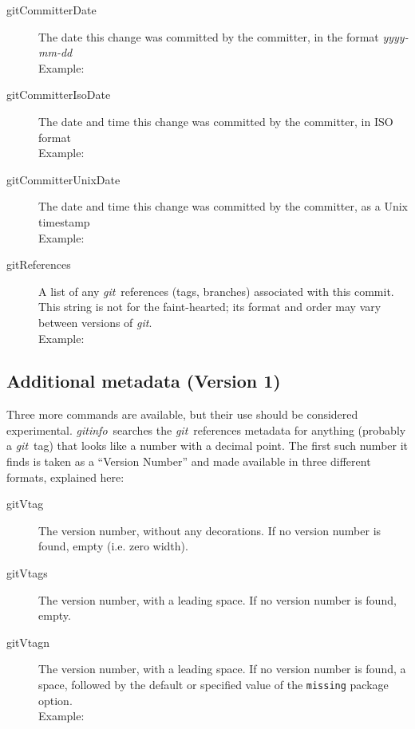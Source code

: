 \documentclass[a4paper,12pt,twoside,openany]{memoir}
\newcommand{\sfit}[1]{\textit{#1}}
\newcommand{\git}{\sfit{git}}
\newcommand{\tpname}{\sfit{gitinfo}}
\begin{document}
\begin{description}
\item[gitCommitterDate]
    The date this change was committed by the committer,
    in the format \textit{yyyy-mm-dd}\\
    Example: \textit{\gitCommitterDate}

\item[gitCommitterIsoDate]
    The date and time this change was committed by the committer,
    in ISO format\\
    Example: \textit{\gitCommitterIsoDate}

\item[gitCommitterUnixDate]
    The date and time this change was committed by the committer,
    as a Unix timestamp\\
    Example: \textit{\gitCommitterUnixDate}

\item[gitReferences]
    A list of any \git\ references (tags, branches) associated
    with this commit.
    This string is not for the faint-hearted;
    its format and order may vary between versions of \git.\\
    Example: \textit{\small\gitReferences}

\end{description}


\subsection{Additional metadata (Version 1)}

Three more commands are available, but their use should be considered
experimental. \tpname\ searches the \git\ references metadata for
anything (probably a \git\ tag) that looks like a number with a decimal point.
The first such number it finds is taken as a ``Version Number''
and made available in three different formats, explained here:

\begin{description}
\item[gitVtag]
    The version number, without any decorations. If no version number is found,
    empty (i.e. zero width).
\item[gitVtags]
    The version number, with a leading space. If no version number is found,
    empty.
\item[gitVtagn]
    The version number, with a leading space.
    If no version number is found, a space,
    followed by the default or specified value of
    the \texttt{missing} package option.\\
    Example: \textit{\gitVtagn}
\end{description}
\end{document}
